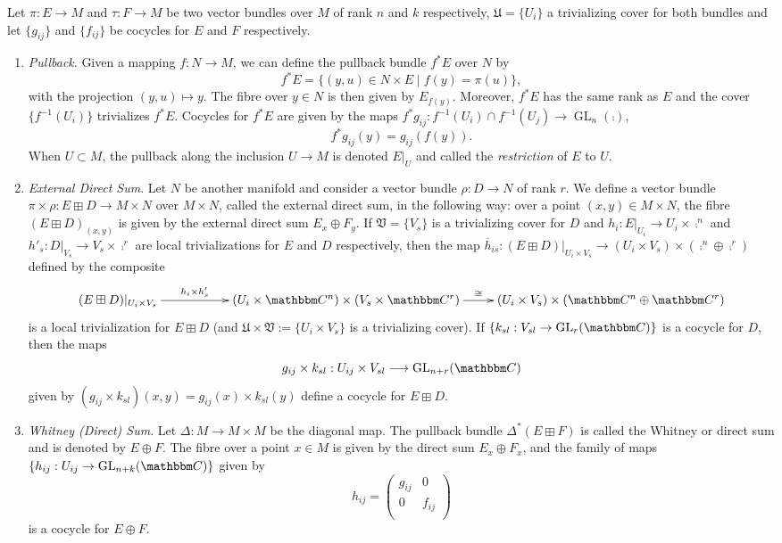 Let $\pi :E\to M$ and $\tau :F\to M$ be two vector bundles over $M$ of
rank $n$ and $k$ respectively, $\mathfrak{U}=\{U_i\}$ a trivializing
cover for both bundles and let $\{g_{ij}\}$ and $\{f_{ij}\}$ be
cocycles for $E$ and $F$ respectively.

\begin{enumerate}
\item \emph{Pullback}. Given a mapping $f:N\to M$, we can define the
  pullback bundle $f^*E$ over $N$ by
$$f^*E=\{(y,u)\in N\times E \; | \; f(y)=\pi (u)\},$$
with the projection $(y,u)\mapsto y$. The fibre over $y\in N$ is then
given by $E_{f(y)}$. Moreover, $f^*E$ has the same rank as $E$ and the
cover $\{f^{-1}(U_i)\}$ trivializes $f^*E$. Cocycles for $f^*E$ are
given by the maps
$f^*g_{ij}:f^{-1}(U_i)\cap f^{-1}(U_j)\to \operatorname{GL}_n(\comp
)$,
$$f^*g_{ij}(y)=g_{ij}(f(y)).$$
When $U\subset M$, the pullback along the inclusion $U\to M$ is
denoted $E|_U$ and called the \emph{restriction} of $E$ to $U$.

\item \emph{External Direct Sum}. Let $N$ be another manifold and
  consider a vector bundle $\rho :D\to N$ of rank $r$. We define a
  vector bundle $\pi \times \rho : E\boxplus D\to M\times N$ over
  $M\times N$, called the external direct sum, in the following way:
  over a point $(x,y)\in M\times N$, the fibre $(E\boxplus D)_{(x,y)}$
  is given by the external direct sum $E_x\oplus F_y$. If
  $\mathfrak{V}=\{V_s\}$ is a trivializing cover for $D$ and
  $h_i:E|_{U_i}\to U_i\times \comp^n$ and
  $h'_s:D|_{V_s}\to V_s\times \comp^r$ are local trivializations for
  $E$ and $D$ respectively, then the map
  $\overline{h}_{is}:(E\boxplus D)|_{U_i\times V_s}\to (U_i\times
  V_s)\times (\comp^n\oplus \comp^r)$ defined by the composite
$$\xymatrix{
  (E\boxplus D)|_{U_i\times V_s}\ar[rr]^-{h_i\times h'_s} &&
  (U_i\times \comp^n)\times (V_s\times \comp^r)\ar[r]^-{\cong} &
  (U_i\times V_s)\times (\comp^n\oplus \comp^r)}$$ is a local
trivialization for $E\boxplus D$ (and
$\mathfrak{U}\times \mathfrak{V}:=\{U_i\times V_s\}$ is a trivializing
cover). If $\{k_{sl}:V_{sl}\to \opnm{GL}_r(\comp )\}$ is a cocycle for
$D$, then the maps
$$g_{ij}\times k_{sl}:U_{ij}\times V_{sl}\longrightarrow \opnm{GL}_{n+r}(\comp )$$
given by $(g_{ij}\times k_{sl})(x,y)=g_{ij}(x)\times k_{sl}(y)$ define
a cocycle for $E\boxplus D$.

\item \emph{Whitney (Direct) Sum}. Let $\Delta :M\to M\times M$ be the
  diagonal map. The pullback bundle $\Delta^*(E\boxplus F)$ is called
  the Whitney or direct sum and is denoted by $E\oplus F$. The fibre
  over a point $x\in M$ is given by the direct sum $E_x\oplus F_x$,
  and the family of maps
  $\{h_{ij}:U_{ij}\to \opnm{GL}_{n+k}(\comp )\}$ given by
$$h_{ij}=
\begin{pmatrix}
  g_{ij} & 0 \\
  0 & f_{ij} \\
\end{pmatrix}
$$
is a cocycle for $E\oplus F$.


\end{enumerate}
